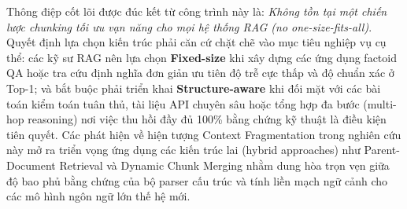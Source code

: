 Thông điệp cốt lõi được đúc kết từ công trình này là: \textit{Không tồn tại một chiến lược chunking tối ưu vạn năng cho mọi hệ thống RAG (no one-size-fits-all)}. Quyết định lựa chọn kiến trúc phải căn cứ chặt chẽ vào mục tiêu nghiệp vụ cụ thể: các kỹ sư RAG nên lựa chọn \textbf{Fixed-size} khi xây dựng các ứng dụng factoid QA hoặc tra cứu định nghĩa đơn giản ưu tiên độ trễ cực thấp và độ chuẩn xác ở Top-1; và bắt buộc phải triển khai \textbf{Structure-aware} khi đối mặt với các bài toán kiểm toán tuân thủ, tài liệu API chuyên sâu hoặc tổng hợp đa bước (multi-hop reasoning) nơi việc thu hồi đầy đủ 100\% bằng chứng kỹ thuật là điều kiện tiên quyết. Các phát hiện về hiện tượng Context Fragmentation trong nghiên cứu này mở ra triển vọng ứng dụng các kiến trúc lai (hybrid approaches) như Parent-Document Retrieval và Dynamic Chunk Merging nhằm dung hòa trọn vẹn giữa độ bao phủ bằng chứng của bộ parser cấu trúc và tính liền mạch ngữ cảnh cho các mô hình ngôn ngữ lớn thế hệ mới.
